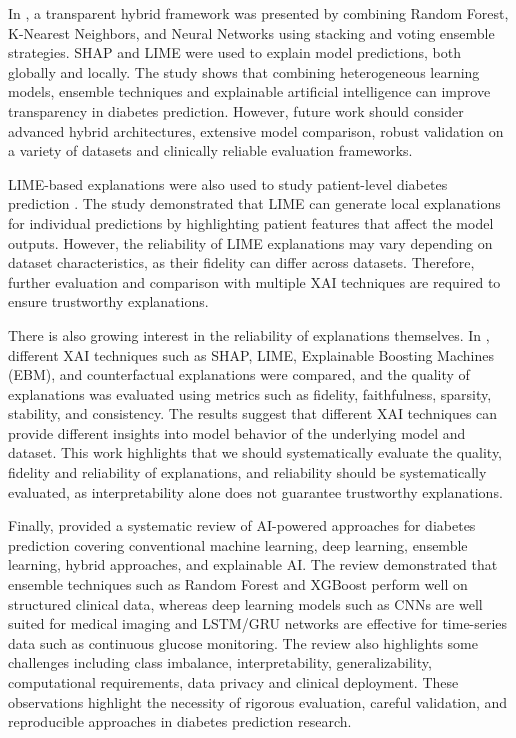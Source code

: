 \documentclass[conference]{IEEEtran}
\begin{document}
In \cite{zaferani2026}, a transparent hybrid framework was presented by combining Random Forest, K-Nearest Neighbors, and Neural Networks using stacking and voting ensemble strategies. SHAP and LIME were used to explain model predictions, both globally and locally. The study shows that combining heterogeneous learning models, ensemble techniques and explainable artificial intelligence can improve transparency in diabetes prediction. However, future work should consider advanced hybrid architectures, extensive model comparison, robust validation on a variety of datasets and clinically reliable evaluation frameworks.

LIME-based explanations were also used to study patient-level diabetes prediction \cite{khokhar2025}. The study demonstrated that LIME can generate local explanations for individual predictions by highlighting patient features that affect the model outputs. However, the reliability of LIME explanations may vary depending on dataset characteristics, as their fidelity can differ across datasets. Therefore, further evaluation and comparison with multiple XAI techniques are required to ensure trustworthy explanations.

There is also growing interest in the reliability of explanations
themselves. In \cite{arora2025}, different XAI techniques such as SHAP, LIME, Explainable Boosting Machines (EBM), and counterfactual explanations were compared, and the quality of explanations was evaluated using metrics such as fidelity, faithfulness, sparsity, stability, and consistency. The results suggest that different XAI techniques can provide different insights into model behavior of the underlying model and dataset. This work highlights that we should systematically evaluate the quality, fidelity and reliability of explanations, and reliability should be systematically evaluated, as interpretability alone does not guarantee trustworthy explanations.


Finally, \cite{masood2026} provided a systematic review of AI-powered approaches for diabetes prediction covering conventional machine learning, deep learning, ensemble learning, hybrid approaches, and explainable AI. The review demonstrated that ensemble techniques such as Random Forest and XGBoost perform well on structured clinical data, whereas deep learning models such as CNNs are well suited for medical imaging and LSTM/GRU networks are effective for time-series data such as continuous glucose monitoring. The review also highlights some challenges including class imbalance, interpretability, generalizability, computational requirements, data privacy and clinical deployment. These observations highlight the necessity of rigorous evaluation, careful validation, and reproducible approaches in diabetes prediction research.
\end{document}
